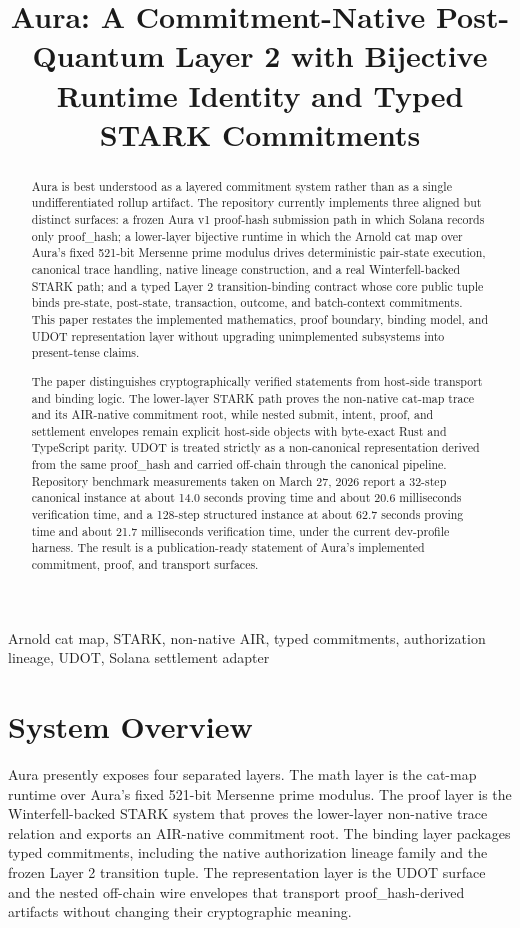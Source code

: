 \documentclass[conference]{IEEEtran}
\title{Aura: A Commitment-Native Post-Quantum Layer 2 with Bijective Runtime Identity and Typed STARK Commitments}
\author{\IEEEauthorblockN{Tyler McRae}}
\begin{document}
\maketitle
\begin{abstract}
Aura is best understood as a layered commitment system rather than as a single undifferentiated rollup artifact. The repository currently implements three aligned but distinct surfaces: a frozen Aura v1 proof-hash submission path in which Solana records only proof\_hash; a lower-layer bijective runtime in which the Arnold cat map over Aura's fixed 521-bit Mersenne prime modulus drives deterministic pair-state execution, canonical trace handling, native lineage construction, and a real Winterfell-backed STARK path; and a typed Layer 2 transition-binding contract whose core public tuple binds pre-state, post-state, transaction, outcome, and batch-context commitments. This paper restates the implemented mathematics, proof boundary, binding model, and UDOT representation layer without upgrading unimplemented subsystems into present-tense claims.

The paper distinguishes cryptographically verified statements from host-side transport and binding logic. The lower-layer STARK path proves the non-native cat-map trace and its AIR-native commitment root, while nested submit, intent, proof, and settlement envelopes remain explicit host-side objects with byte-exact Rust and TypeScript parity. UDOT is treated strictly as a non-canonical representation derived from the same proof\_hash and carried off-chain through the canonical pipeline. Repository benchmark measurements taken on March 27, 2026 report a 32-step canonical instance at about 14.0 seconds proving time and about 20.6 milliseconds verification time, and a 128-step structured instance at about 62.7 seconds proving time and about 21.7 milliseconds verification time, under the current dev-profile harness. The result is a publication-ready statement of Aura's implemented commitment, proof, and transport surfaces.

\end{abstract}
\begin{IEEEkeywords}
Arnold cat map, STARK, non-native AIR, typed commitments, authorization lineage, UDOT, Solana settlement adapter
\end{IEEEkeywords}
\section{System Overview}
Aura presently exposes four separated layers. The math layer is the cat-map runtime over Aura's fixed 521-bit Mersenne prime modulus. The proof layer is the Winterfell-backed STARK system that proves the lower-layer non-native trace relation and exports an AIR-native commitment root. The binding layer packages typed commitments, including the native authorization lineage family and the frozen Layer 2 transition tuple. The representation layer is the UDOT surface and the nested off-chain wire envelopes that transport proof\_hash-derived artifacts without changing their cryptographic meaning.
\end{document}
